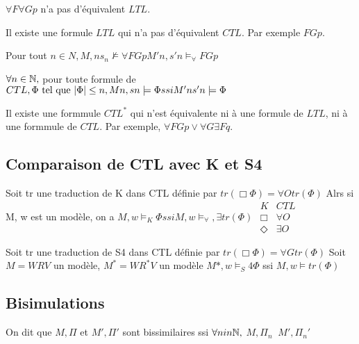 \documentclass[10pt,a4paper]{article}
\DeclareMathOperator{\bisim}{\underline{\leftrightarrow}}
\begin{document}
\begin{ex}
 $\forall F \forall G p$ n'a pas d'équivalent $LTL$.
\end{ex}

\begin{thm}
 Il existe une formule $LTL$ qui n'a pas d'équivalent $CTL$.
Par exemple $FGp$.
\end{thm}

Pour tout $n \in N,
M, n s_n \not \models \forall FGp
M'n, s'n \models_\forall F G p$

\begin{lem}
 $\forall n \in \mathbb{N},$ pour toute formule de $CTL, \Phi \text{ tel que } | \Phi | \leq n, Mn, sn \models \Phi ssi M'n s'n \models \Phi$
\end{lem}

\begin{thm}
 Il existe une formmule $CTL^*$ qui n'est équivalente ni à une formule de $LTL$, ni à une formmule de $CTL$.
Par exemple, $\forall F G p \vee \forall G \exists F q$.
\end{thm}

\subsection{Comparaison de CTL avec K et S4}

\begin{prop}
 Soit tr une traduction de K dans CTL définie par 
$tr(\Box \Phi) = \forall O tr(\Phi)$
Alrs si M, w est un modèle, on a 
$M,w \models_K \Phi ssi M,w \models_\forall,\exists tr(\Phi)$
$
\begin{array}{cc}
 K & CTL\\
 \Box & \forall O
 \\ \Diamond & \exists O
\end{array}$
\end{prop}

\begin{prop}
  Soit tr une traduction de S4 dans CTL définie par
$tr(\Box \Phi ) = \forall G tr(\Phi)$
Soit $M = W R V$ un modèle, $M^* = W R^* V$ un modèle
$M* , w \models_S4 \Phi$ ssi $M,w \models tr(\Phi)$
\end{prop}

\subsection{Bisimulations}

\begin{definition}
 On dit que $M, \Pi$ et $M', \Pi'$ sont bissimilaires  ssi $\forall n in \mathbb{N}, $
$M, \Pi_n \bisim M', \Pi_n'$
\end{definition}
\end{document}
